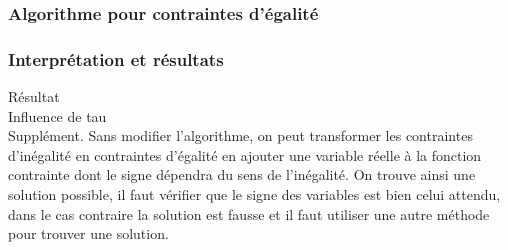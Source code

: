 \documentclass[a4paper,12pt]{article}
\begin{document}
\subsubsection{Algorithme pour contraintes d'égalité}

\subsubsection{Interprétation et résultats}
Résultat\\

Influence de tau\\

Supplément.
Sans modifier l'algorithme, on peut transformer les contraintes d'inégalité en contraintes d'égalité en ajouter une variable réelle à la fonction contrainte dont le signe dépendra du sens de l'inégalité. On trouve ainsi une solution possible, il faut vérifier que le signe des variables est bien celui attendu, dans le cas contraire la solution est fausse et il faut utiliser une autre méthode pour trouver une solution.\\
\end{document}
